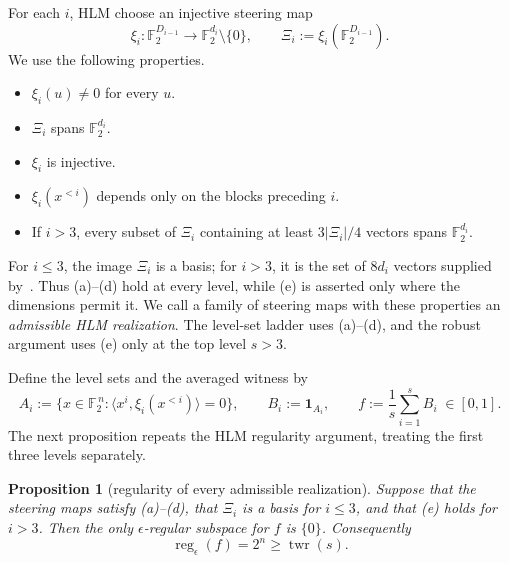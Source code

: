 \documentclass[11pt]{article}
\theoremstyle{plain}
\newtheorem{proposition}[theorem]{Proposition}
\theoremstyle{definition}
\numberwithin{theorem}{section}
\newcommand{\F}{\mathbb{F}}
\newcommand{\inner}[2]{\langle #1,#2\rangle}
\newcommand{\abs}[1]{\lvert #1\rvert}
\newcommand{\twr}{\operatorname{twr}}
\newcommand{\reg}{\operatorname{reg}}
\newcommand{\Xii}{\Xi}
\begin{document}
For each $i$, HLM choose an injective steering map
\[
  \xi_i\colon\F_2^{D_{i-1}}\longrightarrow
  \F_2^{d_i}\setminus\{0\},
  \qquad \Xii_i:=\xi_i(\F_2^{D_{i-1}}).
\]
We use the following properties.
\begin{itemize}
\item[(a)] $\xi_i(u)\ne0$ for every $u$.
\item[(b)] $\Xii_i$ spans $\F_2^{d_i}$.
\item[(c)] $\xi_i$ is injective.
\item[(d)] $\xi_i(x^{<i})$ depends only on the blocks preceding $i$.
\item[(e)] If $i>3$, every subset of $\Xii_i$ containing at least
  $3\abs{\Xii_i}/4$ vectors spans $\F_2^{d_i}$.
\end{itemize}
For $i\le3$, the image $\Xii_i$ is a basis; for $i>3$, it is the set of
$8d_i$ vectors supplied by~\cite[Claim~2.1]{HLM}.  Thus (a)--(d) hold at
every level, while (e) is asserted only where the dimensions permit it.  We
call a family of steering maps with these properties an \emph{admissible HLM
realization}.  The level-set ladder uses (a)--(d), and the robust argument
uses (e) only at the top level $s>3$.

Define the level sets and the averaged witness by
\[
  A_i:=\bigl\{x\in\F_2^{\,n}:\inner{x^i}{\xi_i(x^{<i})}=0\bigr\},
  \qquad B_i:=\mathbf 1_{A_i},\qquad
  f:=\frac1s\sum_{i=1}^s B_i\;\in[0,1].
\]
The next proposition repeats the HLM regularity argument, treating the first
three levels separately.

\begin{proposition}[regularity of every admissible realization]
\label{prop:hlm-regularity}
Suppose that the steering maps satisfy (a)--(d), that $\Xii_i$ is a basis for
$i\le3$, and that (e) holds for $i>3$. Then the only
$\epsilon$-regular subspace for $f$ is $\{0\}$. Consequently
\[
  \reg_\epsilon(f)=2^n\ge\twr(s).
\]
\end{proposition}
\end{document}
